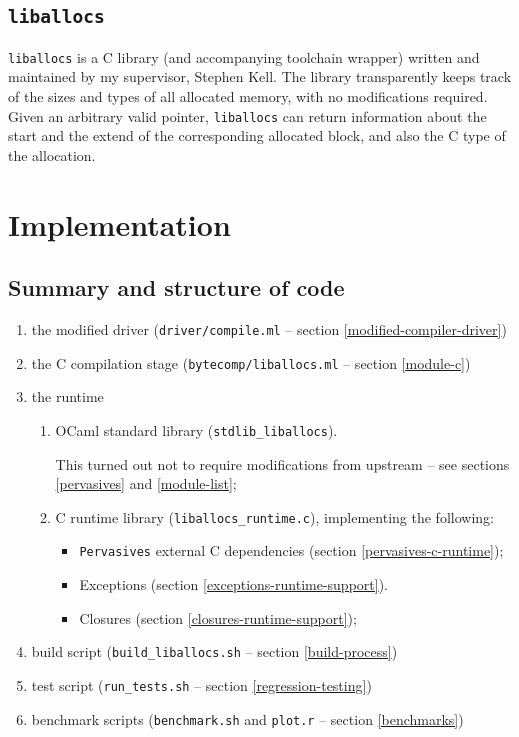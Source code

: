 \documentclass[12pt,a4paper,twoside,openright]{report}
\begin{document}
\section{\texttt{liballocs}}

\lstinline!liballocs! is a C library (and accompanying toolchain wrapper)
written and maintained by my supervisor, Stephen Kell. The library transparently
keeps track of the sizes and types of all allocated memory, with no
modifications required. Given an arbitrary valid pointer, \lstinline!liballocs!
can return information about the start and the extend of the corresponding
allocated block, and also the C type of the allocation.


\chapter{Implementation}

\section{Summary and structure of code}

\begin{enumerate}
  \item the modified driver (\lstinline!driver/compile.ml! -- section \ref{modified-compiler-driver})
  \item the C compilation stage (\lstinline!bytecomp/liballocs.ml! -- section \ref{module-c})
  \item the runtime
    \begin{enumerate}
      \item OCaml standard library (\lstinline!stdlib_liballocs!).

        This turned out not to require modifications from upstream -- see sections \ref{pervasives} and \ref{module-list};
      \item C runtime library (\lstinline!liballocs_runtime.c!), implementing the following:
        \begin{itemize}
          \item \lstinline!Pervasives! external C dependencies (section \ref{pervasives-c-runtime});
          \item Exceptions (section \ref{exceptions-runtime-support}).
          \item Closures (section \ref{closures-runtime-support});
        \end{itemize}
    \end{enumerate}
  \item build script (\lstinline!build_liballocs.sh! -- section \ref{build-process})
  \item test script (\lstinline!run_tests.sh! -- section \ref{regression-testing})
  \item benchmark scripts (\lstinline!benchmark.sh! and \lstinline!plot.r! -- section \ref{benchmarks})
\end{enumerate}
\end{document}
